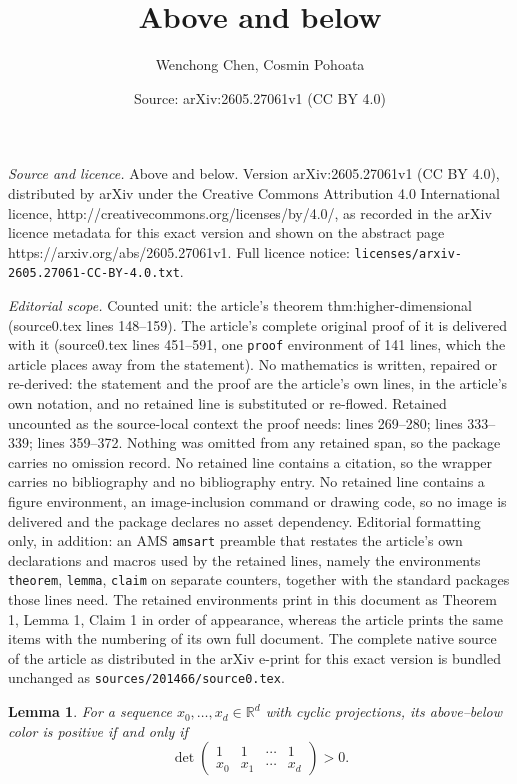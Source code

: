 \documentclass[10pt,a4paper]{amsart}
\title{Above and below}
\author{Wenchong Chen, Cosmin Pohoata}
\date{Source: arXiv:2605.27061v1 (CC BY 4.0)}
\newtheorem{lemma}{Lemma}
\begin{document}
\maketitle

\noindent\emph{Source and licence.} Above and below. Version arXiv:2605.27061v1 (CC BY 4.0), distributed by arXiv under the Creative Commons Attribution 4.0 International licence, http://creativecommons.org/licenses/by/4.0/, as recorded in the arXiv licence metadata for this exact version and shown on the abstract page https://arxiv.org/abs/2605.27061v1. Full licence notice: \texttt{licenses/arxiv-2605.27061-CC-BY-4.0.txt}.\par\smallskip

\noindent\textit{Editorial scope.} Counted unit: the article's theorem thm:higher-dimensional (source0.tex lines 148--159). The article's complete original proof of it is delivered with it (source0.tex lines 451--591, one \texttt{proof} environment of 141 lines, which the article places away from the statement). No mathematics is written, repaired or re-derived: the statement and the proof are the article's own lines, in the article's own notation, and no retained line is substituted or re-flowed.  Retained uncounted as the source-local context the proof needs: lines 269--280; lines 333--339; lines 359--372.  Nothing was omitted from any retained span, so the package carries no omission record.  No retained line contains a citation, so the wrapper carries no bibliography and no bibliography entry.  No retained line contains a figure environment, an image-inclusion command or drawing code, so no image is delivered and the package declares no asset dependency.  Editorial formatting only, in addition: an AMS \texttt{amsart} preamble that restates the article's own declarations and macros used by the retained lines, namely the environments \texttt{theorem}, \texttt{lemma}, \texttt{claim} on separate counters, together with the standard packages those lines need.  The retained environments print in this document as Theorem 1, Lemma 1, Claim 1 in order of appearance, whereas the article prints the same items with the numbering of its own full document.  The complete native source of the article as distributed in the arXiv e-print for this exact version is bundled unchanged as \texttt{sources/201466/source0.tex}.
\begin{lemma}\label{lem:color-det}
For a sequence $x_0,\ldots,x_d\in\mathbb R^d$ with cyclic projections, its
above--below color is positive if and only if
\[
\det
\begin{pmatrix}
1&1&\cdots&1\\
x_0&x_1&\cdots&x_d
\end{pmatrix}
>0.
\]
\end{lemma}
\end{document}

